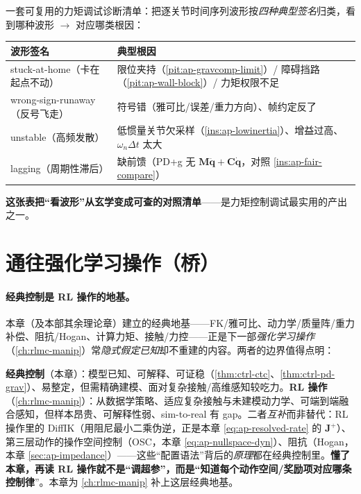 \begin{insight}[力矩跟踪故障的四种波形签名]\label{ins:ap-signatures}
一套可复用的力矩调试诊断清单：把逐关节时间序列波形按\emph{四种典型签名}归类，看到哪种波形 $\to$ 对应哪类根因：
\begin{table}[H]\centering\small
\begin{tabular}{p{} p{}}
\toprule
波形签名 & 典型根因 \\
\midrule
stuck-at-home（卡在起点不动）& 限位夹持（\cref{pit:ap-gravcomp-limit}）/ 障碍挡路（\cref{pit:ap-wall-block}）/ 力矩权限不足 \\
wrong-sign-runaway（反号飞走）& 符号错（雅可比/误差/重力方向）、帧约定反了 \\
unstable（高频发散）& 低惯量关节欠采样（\cref{ins:ap-lowinertia}）、增益过高、$\omega_n\Delta t$ 太大 \\
lagging（周期性滞后）& 缺前馈（PD+g 无 $\mathbf{M}\ddot{\mathbf{q}}+\mathbf{C}\dot{\mathbf{q}}$，对照 \cref{ins:ap-fair-compare}）\\
\bottomrule
\end{tabular}
\label{tab:ap-signatures}
\end{table}
\textbf{这张表把“看波形”从玄学变成可查的对照清单}——是力矩控制调试最实用的产出之一。
\end{insight}

\section{通往强化学习操作（桥）}
\label{sec:ap-to-rl}

\paragraph{经典控制是 RL 操作的地基。}
本章（及本部其余理论章）建立的经典地基——FK/雅可比、动力学/质量阵/重力补偿、阻抗/Hogan、计算力矩、接触/力控——正是下一部\emph{强化学习操作}（\cref{ch:rlmc-manip}）常\emph{隐式假定已知}却不重建的内容。两者的边界值得点明：

\begin{insight}\label{ins:ap-rl-boundary}
\textbf{经典控制}（本章）：模型已知、可解释、可证稳（\cref{thm:ctrl-ctc}、\cref{thm:ctrl-pd-grav}）、易整定，但需精确建模、面对复杂接触/高维感知较吃力。\textbf{RL 操作}（\cref{ch:rlmc-manip}）：从数据学策略、适应复杂接触与未建模动力学、可端到端融合感知，但样本昂贵、可解释性弱、sim-to-real 有 gap。二者\emph{互补}而非替代：RL 操作里的 DiffIK（用阻尼最小二乘伪逆，正是本章 \cref{eq:ap-resolved-rate} 的 $\mathbf{J}^{+}$）、第三层动作的操作空间控制（OSC，本章 \cref{eq:ap-nullspace-dyn}）、阻抗（Hogan，本章 \cref{sec:ap-impedance}）——这些“配置语法”背后的\emph{原理}都在经典控制里。\textbf{懂了本章，再读 RL 操作就不是“调超参”，而是“知道每个动作空间/奖励项对应哪条控制律}”。本章为 \cref{ch:rlmc-manip} 补上这层经典地基。
\end{insight}

